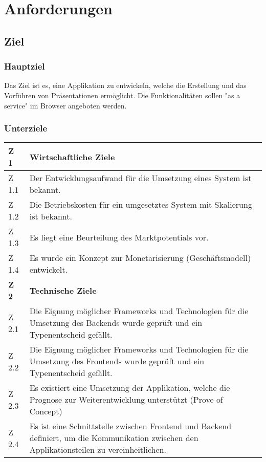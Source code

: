 \chapter{Anforderungen}
\label{chap:requirements}

\section{Ziel}
\label{sec:ziel}

\subsection{Hauptziel}
Das Ziel ist es, eine Applikation zu entwickeln, welche die Erstellung und das Vorführen von Präsentationen ermöglicht. Die Funktionalitäten sollen "as a service" im Browser angeboten werden.

\begingroup
\setlength{\tabcolsep}{10pt} %
\renewcommand{\arraystretch}{1.5}
\subsection{Unterziele}
\begin{tabularx}{\textwidth}{ |l|X| }
  \hline
  \textbf{Z 1}	& \textbf{Wirtschaftliche Ziele}	\\	\hline
  Z 1.1	& Der Entwicklungsaufwand für die Umsetzung eines System ist bekannt.  	\\	\hline
  Z 1.2	& Die Betriebskosten für ein umgesetztes System mit Skalierung ist bekannt.  	\\	\hline
  Z 1.3	& Es liegt eine Beurteilung des Marktpotentials vor.  	\\	\hline
  Z 1.4	& Es wurde ein Konzept zur Monetarisierung (Geschäftsmodell) entwickelt. 	\\	\hline
  \hline
  \textbf{Z 2}	& \textbf{Technische Ziele}	\\	\hline
  Z 2.1	& Die Eignung möglicher Frameworks und Technologien für die Umsetzung des Backends wurde geprüft und ein Typenentscheid gefällt.	\\	\hline
  Z 2.2	& Die Eignung möglicher Frameworks und Technologien für die Umsetzung des Frontends wurde geprüft und ein Typenentscheid gefällt.	\\	\hline  
  Z 2.3	& Es existiert eine Umsetzung der Applikation, welche die Prognose zur Weiterentwicklung unterstützt (Prove of Concept) \\	\hline    
  Z 2.4	& Es ist eine Schnittstelle zwischen Frontend und Backend definiert, um die Kommunikation zwischen den Applikationsteilen zu vereinheitlichen. \\	\hline   
  \end{tabularx}
\endgroup


